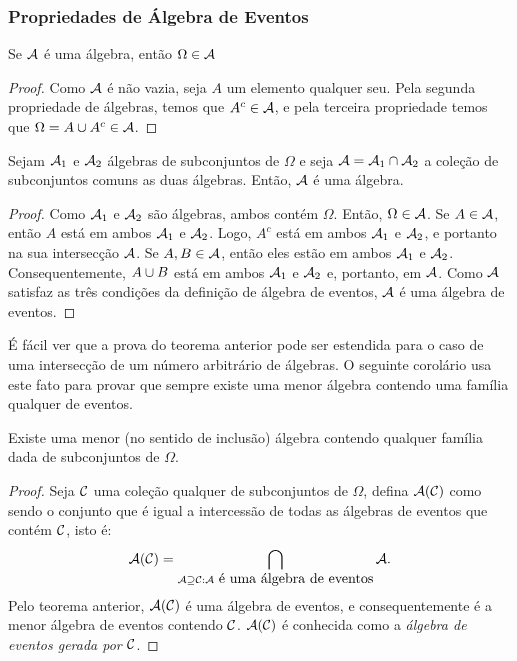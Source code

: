 \begin{frame}
\frametitle{Propriedades de Álgebra de Eventos}

\vspace{-0.1cm}
\begin{lema} Se ${\cal A}$ é uma álgebra, então $\Omega\in{\cal A}$ \end{lema}

\begin{proof} Como ${\cal A}$ é não vazia, seja $A$ um elemento qualquer seu. Pela
segunda propriedade de álgebras, temos que $A^c\in{\cal A}$, e pela
terceira propriedade temos que $\Omega=A\cup A^c\in{\cal A}$. \end{proof}

\begin{teo} \label{interalgebra}Sejam ${\cal A}_1$ e ${\cal A}_2$ álgebras de subconjuntos de $\Omega$ e
seja ${\cal A}={\cal A}_1\cap {\cal A}_2$ a coleção de subconjuntos comuns as duas
álgebras. Então, ${\cal A}$ é uma álgebra. \end{teo}

\begin{proof} Como ${\cal A}_1$ e ${\cal A}_2$ são álgebras, ambos contém $\Omega$.
Então, $\Omega\in{\cal A}$. Se $A\in{\cal A}$, então $A$ está em ambos ${\cal A}_1$ e
${\cal A}_2$. Logo, $A^c$ está em ambos ${\cal A}_1$ e ${\cal A}_2$, e portanto na sua
intersecção ${\cal A}$. Se $A,B\in{\cal A}$, então eles estão em ambos ${\cal A}_1$ e
${\cal A}_2$. Consequentemente, $A\cup B$ está em ambos ${\cal A}_1$ e ${\cal A}_2$
e, portanto, em ${\cal A}$. Como ${\cal A}$ satisfaz as três condições da
definição de álgebra de eventos, ${\cal A}$ é uma álgebra de eventos.
\end{proof}

\end{frame}
%
\begin{frame}


É fácil ver que a prova do
teorema anterior pode ser estendida para o caso
de uma intersecção de um número arbitrário de álgebras. O seguinte corolário usa este fato
para provar que sempre existe uma menor álgebra contendo uma família qualquer de eventos.

\begin{corol} Existe uma menor (no sentido de inclusão) álgebra contendo
qualquer família dada de subconjuntos de $\Omega$. \end{corol}
\begin{proof}
Seja ${\cal C}$ uma coleção qualquer de subconjuntos de $\Omega$, defina ${\cal A}({\cal C})$ como sendo o conjunto que é igual a intercessão de todas as álgebras de eventos que contém ${\cal C}$, isto é:
$${\cal A}({\cal C})=\bigcap_{{\cal A}\supseteq{\cal C}:{\cal A}\mbox{ é uma álgebra de eventos}}{\cal A}.$$
Pelo
teorema anterior, ${\cal A}({\cal C})$ é uma álgebra de eventos, e consequentemente é a menor álgebra de eventos contendo ${\cal C}$. ${\cal A}({\cal C})$ é conhecida como a {\em álgebra de eventos gerada por ${\cal C}$}.
\end{proof}
%
\end{frame}
